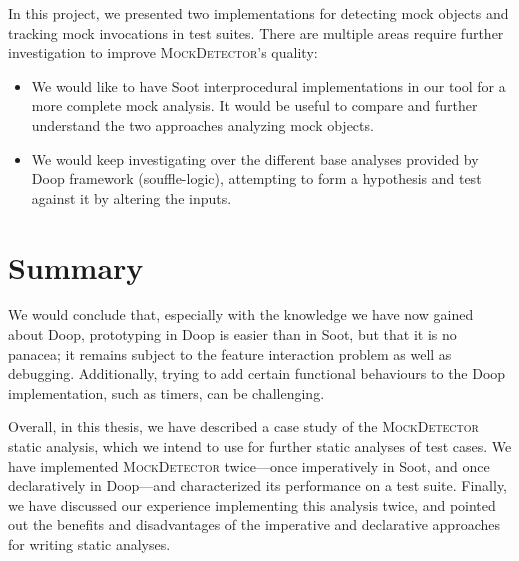 In this project, we presented two implementations for detecting mock objects and tracking mock invocations in test suites. There are multiple areas require further investigation to improve \textsc{MockDetector}'s quality:

\begin{itemize}
	\item We would like to have Soot interprocedural implementations in our tool for a more complete mock analysis. It would be useful to compare and further understand the two approaches analyzing mock objects.
	\item We would keep investigating over the different base analyses provided by Doop framework (souffle-logic), attempting to form a hypothesis and test against it by altering the inputs.
\end{itemize}


\section{Summary} 

We would conclude that, especially with the knowledge we have now gained about Doop, prototyping in Doop is easier than in Soot, but that it is no panacea; it remains subject to the feature interaction problem as well as debugging. Additionally, trying to add certain functional behaviours to the Doop implementation, such as timers, can be challenging.

Overall, in this thesis, we have described a case study of the \textsc{MockDetector} static analysis, which we intend to use for further static analyses of test cases. We have implemented \textsc{MockDetector} twice---once imperatively in Soot, and once declaratively in Doop---and characterized its performance on a test suite. Finally, we have discussed our experience implementing this analysis twice, and pointed out the benefits and disadvantages of the imperative and declarative approaches for writing static analyses.